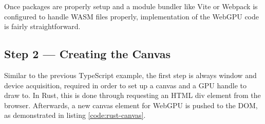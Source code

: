 %


Once packages are properly setup and a module bundler like Vite or Webpack is configured to handle WASM files properly,
implementation of the WebGPU code is fairly straightforward.



\subsection{Step 2 --- Creating the Canvas}
Similar to the previous TypeScript example, the first step is always window and device acquisition, required in order
to set up a canvas and a GPU handle to draw to. In Rust, this is done through requesting an HTML div element from the browser.
Afterwards, a new canvas element for WebGPU is pushed to the DOM, as demonstrated in listing \ref{code:rust-canvas}.

\begin{samepage}
  
    {
      Example of setting up a canvas element inside the HTML DOM via Rust.
    }},
    language=JavaScript,
    firstnumber=165,
    label=code:rust-canvas
    ]
    {listings/wasm/lib_canvas.rs}
\end{samepage}

%



